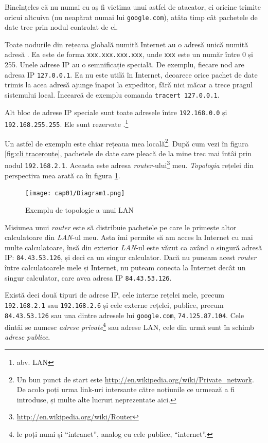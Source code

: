 Bineînțeles că nu numai eu aș fi
victima unui astfel de atacator, ci oricine trimite 
oricui altcuiva (nu neapărat numai lui \texttt{google.com}), atâta timp cât pachetele
de date trec prin nodul controlat de el.

Toate nodurile din rețeaua globală numită Internet au o adresă unică numită adresă
. Ea este de forma \texttt{xxx.xxx.xxx.xxx}, unde \texttt{xxx} este un număr
între 0 și 255. Unele adrese IP au o semnificație specială. De exemplu, fiecare
nod are adresa IP \texttt{127.0.0.1}. Ea nu este utilă în Internet, deoarece orice pachet
de date trimis la acea adresă ajunge înapoi la expeditor, fără nici măcar a trece
pragul sistemului local. Încearcă de exemplu comanda \texttt{tracert 127.0.0.1}.

Alt bloc de adrese IP speciale sunt toate adresele între \texttt{192.168.0.0} și
\texttt{192.168.255.255}. Ele sunt rezervate .\footnote{abv. LAN}

Un astfel de exemplu este chiar rețeaua mea
locală\footnote{Un bun punct de start este \url{http://en.wikipedia.org/wiki/Private_network}.
De acolo poți urma link-uri intersante către noțiunile ce urmează a fi introduse,
și multe alte lucruri neprezentate aici.}.
După cum vezi în figura \ref{fig:cli traceroute},
pachetele de date care pleacă de la mine trec mai întâi prin nodul \texttt{192.168.2.1}.
Aceasta este adresa \textsl{router}-ului\footnote{\url{http://en.wikipedia.org/wiki/Router}}
meu. \textsl{Topologia} rețelei din perspectiva mea
arată ca în figura \ref{fig:topologie}.

\begin{figure}[h]
 \centering
   \texttt{[image: cap01/Diagram1.png]}
 \caption{Exemplu de topologie a unui LAN}
 \label{fig:topologie}
\end{figure}

Misiunea unui \textsl{router} este să distribuie pachetele
pe care le primește altor calculatoare din \textsl{LAN}-ul meu. Asta îmi permite să am acces
la Internet cu mai multe calculatoare, însă din exterior \textsl{LAN}-ul este văzut ca
având o singură adresă IP: \texttt{84.43.53.126}, și deci ca un singur calculator. Dacă
nu puneam acest \textsl{router} între calculatoarele mele și Internet, nu puteam conecta
la Internet decât un singur calculator, care avea adresa IP \texttt{84.43.53.126}.

\sloppy Există deci două tipuri de adrese IP, cele interne rețelei mele, precum \texttt{192.168.2.1}
sau \texttt{192.168.2.6} și cele externe rețelei, publice, precum \texttt{84.43.53.126} sau una
dintre adresele lui \texttt{google.com}, \texttt{74.125.87.104}.
Cele dintâi se numesc \textsl{adrese private}\footnote{le poți numi și ``intranet'',
analog cu cele publice, ``internet''.}
sau adrese LAN, cele din urmă sunt în schimb \textsl{adrese publice}.

